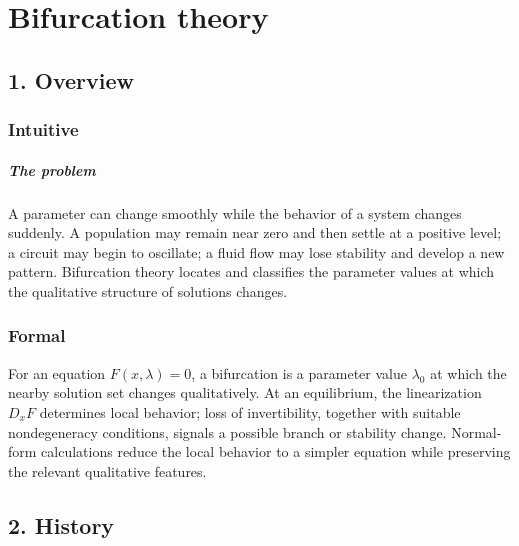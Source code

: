 \clearpage\chapter{Bifurcation theory}
\section*{1. Overview}
\subsection*{Intuitive}
\paragraph{The problem}

A parameter can change smoothly while the behavior of a system changes suddenly. A population may remain near zero and then settle at a positive level; a circuit may begin to oscillate; a fluid flow may lose stability and develop a new pattern. Bifurcation theory locates and classifies the parameter values at which the qualitative structure of solutions changes.



\subsection*{Formal}
For an equation $F(x,\lambda)=0$, a bifurcation is a parameter value $\lambda_0$ at which the nearby solution set changes qualitatively. At an equilibrium, the linearization $D_xF$ determines local behavior; loss of invertibility, together with suitable nondegeneracy conditions, signals a possible branch or stability change. Normal-form calculations reduce the local behavior to a simpler equation while preserving the relevant qualitative features.
\section*{2. History}
